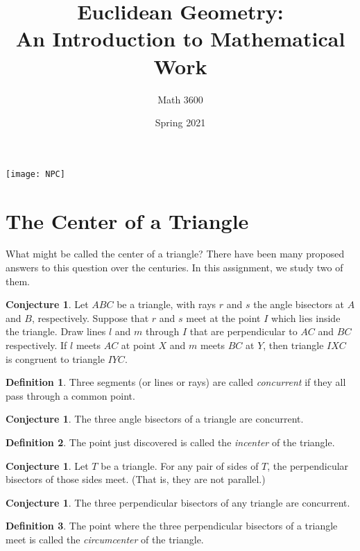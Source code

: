 \documentclass{tufte-handout}
\title{Euclidean Geometry:\\An Introduction to Mathematical Work}
\author[]{Math 3600}
\date{Spring 2021}
\theoremstyle{definition}
\newtheorem{conjecture}[problem]{Conjecture}
\newtheorem*{definition}{Definition}
\begin{document}
\maketitle

\begin{marginfigure}
    \texttt{[image: NPC]}
\end{marginfigure}

\setcounter{section}{8}
\section{The Center of a Triangle}

What might be called the center of a triangle? There have been many proposed answers to this question over the centuries. In this assignment, we study two of them.

\begin{conjecture}\label{conj:angle-bisectors-concurrent}
Let $ABC$ be a triangle, with rays $r$ and $s$ the angle bisectors at $A$ and $B$, respectively. Suppose that $r$ and $s$ meet at the point $I$ which lies inside the triangle. Draw lines $l$ and $m$ through $I$ that are perpendicular to $AC$ and $BC$ respectively. If $l$ meets $AC$ at point $X$ and $m$ meets $BC$ at $Y$, then triangle $IXC$ is congruent to triangle $IYC$.
\end{conjecture}


\begin{definition}\label{defn:concurrent}
Three segments (or lines or rays) are called \emph{concurrent} if they all pass through a common point.
\end{definition}

\begin{conjecture}\label{conj:incenter-concurrent}
The three angle bisectors of a triangle are concurrent.
\end{conjecture}

\begin{definition}\label{defn:incenter}
The point just discovered is called the \emph{incenter} of the triangle.
\end{definition}

\begin{conjecture}\label{conj:meeting-perp-bisectors}
Let $T$ be a triangle. For any pair of sides of $T$, the perpendicular bisectors of those sides meet. (That is, they are not parallel.)
\end{conjecture}

\begin{conjecture}\label{conj:circumcenter}
The three perpendicular bisectors of any triangle are concurrent.
\end{conjecture}

\begin{definition}\label{defn:circumcenter}
The point where the three perpendicular bisectors of a triangle meet is called the \emph{circumcenter} of the triangle.
\end{definition}








\vfill
\end{document}
